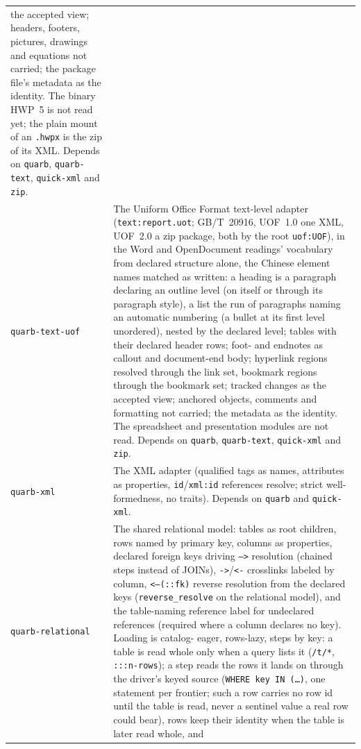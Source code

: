\documentclass{report}
\begin{document}
\begin{xltabular}{\textwidth}{l X}
  the accepted view; headers, footers, pictures, drawings and
  equations not carried; the package file's metadata as the
  identity. The binary HWP~5 is not read yet; the plain mount of an
  \texttt{.hwpx} is the zip of its XML. Depends on \texttt{quarb},
  \texttt{quarb-text}, \texttt{quick-xml} and \texttt{zip}. \\
\texttt{quarb-text-uof} & The Uniform Office Format text-level
  adapter (\texttt{text:report.uot}; GB/T~20916, UOF~1.0 one XML,
  UOF~2.0 a zip package, both by the root \texttt{uof:UOF}), in the
  Word and OpenDocument readings' vocabulary from declared structure
  alone, the Chinese element names matched as written: a heading is
  a paragraph declaring an outline level (on itself or through its
  paragraph style), a list the run of paragraphs naming an automatic
  numbering (a bullet at its first level unordered), nested by the
  declared level; tables with their declared header rows; foot- and
  endnotes as callout and document-end body; hyperlink regions
  resolved through the link set, bookmark regions through the
  bookmark set; tracked changes as the accepted view; anchored
  objects, comments and formatting not carried; the metadata as the
  identity. The spreadsheet and presentation modules are not read.
  Depends on \texttt{quarb}, \texttt{quarb-text}, \texttt{quick-xml}
  and \texttt{zip}. \\
\texttt{quarb-xml} & The XML adapter (qualified tags as names,
  attributes as properties, \texttt{id}/\texttt{xml:id} references
  resolve; strict well-formedness, no traits). Depends on
  \texttt{quarb} and \texttt{quick-xml}. \\
\texttt{quarb-relational} & The shared relational model: tables
  as root children, rows named by primary key, columns as
  properties, declared foreign keys driving
  \texttt{-->} resolution (chained steps instead of
  JOINs), \texttt{->}/\texttt{<-} crosslinks labeled by column,
  \texttt{<--(::fk)} reverse resolution from the declared keys
  (\texttt{reverse\_resolve} on the relational model), and the
  table-naming reference label for undeclared references (required
  where a column declares no key). Loading is catalog-
  eager, rows-lazy, steps by key: a table is read whole only when a
  query lists it (\texttt{/t/*}, \texttt{:::n-rows}); a step reads
  the rows it lands on through the driver's keyed source
  (\texttt{WHERE key IN (\dots)}, one statement per frontier; such
  a row carries no row id until the table is read, never a
  sentinel value a real row could bear), rows
  keep their identity when the table is later read whole, and

\end{xltabular}
\end{document}
